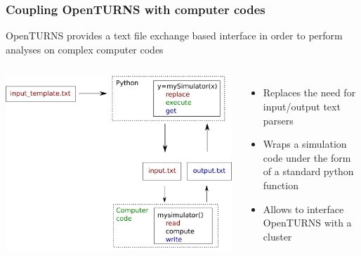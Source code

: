 \documentclass[aspectratio=169]{beamer}
\begin{document}

\begin{frame}[containsverbatim]
\frametitle{Coupling OpenTURNS with computer codes}

\small

OpenTURNS provides a text file exchange based interface in order to perform analyses on complex computer codes

\vspace{10pt}

\begin{columns}
    
\centering

\includegraphics[width=.8\textwidth]{figures/Coupling.pdf}


\begin{itemize}
\item Replaces the need for input/output text parsers
\item Wraps a simulation code under the form of a standard python function
\item Allows to interface OpenTURNS with a cluster
\end{itemize}

\end{columns}

\end{frame}










\end{document}
